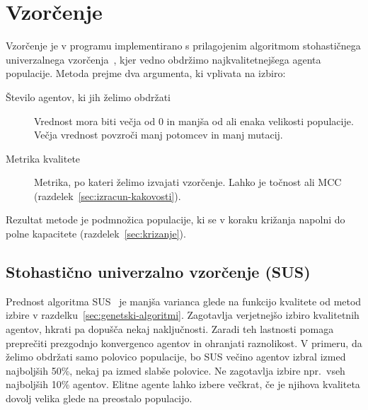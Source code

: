 \documentclass[a4paper,12pt,openright]{book}
\begin{document}
    \section{Vzorčenje}\label{sec:vzorcenje}
    Vzorčenje je v programu implementirano s prilagojenim algoritmom stohastičnega univerzalnega vzorčenja~\cite{inteligentni_sistemi_2010},
    kjer vedno obdržimo najkvalitetnejšega agenta populacije.
    Metoda prejme dva argumenta, ki vplivata na izbiro:
    \begin{description}
        \item[Število agentov, ki jih želimo obdržati]{Vrednost mora biti večja od 0 in manjša od ali enaka velikosti populacije.
        Večja vrednost povzroči manj potomcev in manj mutacij.}
        \item[Metrika kvalitete]{Metrika, po kateri želimo izvajati vzorčenje. Lahko je točnost ali MCC (razdelek~\ref{sec:izracun-kakovosti}).}
    \end{description}
    Rezultat metode je podmnožica populacije, ki se v koraku križanja napolni do polne kapacitete (razdelek~\ref{sec:krizanje}).

    \subsection{Stohastično univerzalno vzorčenje (SUS)}\label{subsec:stohasticno-univerzalno-vzorcenje}
    Prednost algoritma SUS~\cite{inteligentni_sistemi_2010} je manjša varianca glede na funkcijo kvalitete od metod izbire v razdelku~\ref{sec:genetski-algoritmi}.
    Zagotavlja verjetnejšo izbiro kvalitetnih agentov, hkrati pa dopušča nekaj naključnosti.
    Zaradi teh lastnosti pomaga preprečiti prezgodnjo konvergenco agentov in ohranjati raznolikost.
    V primeru, da želimo obdržati samo polovico populacije, bo SUS večino agentov izbral izmed najboljših 50\%,
    nekaj pa izmed slabše polovice.
    Ne zagotavlja izbire npr.\ vseh najboljših 10\% agentov.
    Elitne agente lahko izbere večkrat, če je njihova kvaliteta dovolj velika glede na preostalo populacijo.
\end{document}
